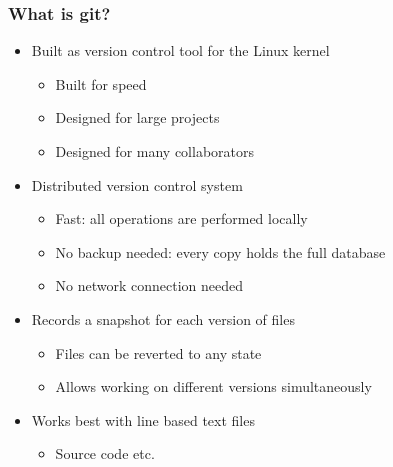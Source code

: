 \documentclass{beamer}
\begin{document}
\begin{frame}
    \frametitle{What is git?}
    \begin{itemize}
        \item Built as version control tool for the Linux kernel
            \begin{itemize}
                \item Built for speed
                \item Designed for large projects
                \item Designed for many collaborators
            \end{itemize}
        \item Distributed version control system
            \begin{itemize}
                \item Fast: all operations are performed locally
                \item No backup needed: every copy holds the full database
                \item No network connection needed
            \end{itemize}
        \item Records a snapshot for each version of files
            \begin{itemize}
                \item Files can be reverted to any state
                \item Allows working on different versions simultaneously
            \end{itemize}
        \item Works best with line based text files
            \begin{itemize}
                \item Source code etc.
            \end{itemize}
    \end{itemize}
\end{frame}

\end{document}
